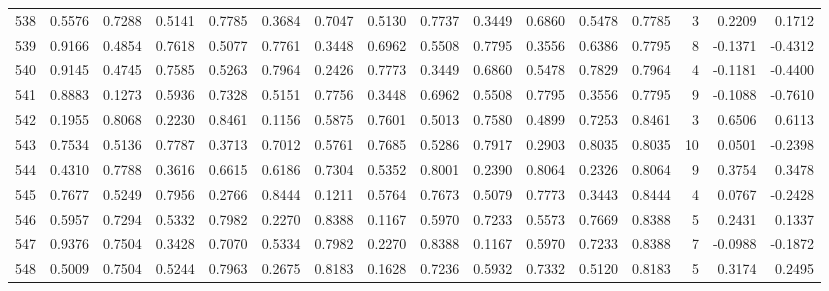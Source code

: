 \begin{tabular}{lrrrrrrrrrrrrrrr}
538 &      0.5576 &  0.7288 &  0.5141 &  0.7785 &  0.3684 &  0.7047 &  0.5130 &  0.7737 &  0.3449 &  0.6860 &   0.5478 &     0.7785 &      3 &                    0.2209 &                     0.1712 \\
539 &      0.9166 &  0.4854 &  0.7618 &  0.5077 &  0.7761 &  0.3448 &  0.6962 &  0.5508 &  0.7795 &  0.3556 &   0.6386 &     0.7795 &      8 &                   -0.1371 &                    -0.4312 \\
540 &      0.9145 &  0.4745 &  0.7585 &  0.5263 &  0.7964 &  0.2426 &  0.7773 &  0.3449 &  0.6860 &  0.5478 &   0.7829 &     0.7964 &      4 &                   -0.1181 &                    -0.4400 \\
541 &      0.8883 &  0.1273 &  0.5936 &  0.7328 &  0.5151 &  0.7756 &  0.3448 &  0.6962 &  0.5508 &  0.7795 &   0.3556 &     0.7795 &      9 &                   -0.1088 &                    -0.7610 \\
542 &      0.1955 &  0.8068 &  0.2230 &  0.8461 &  0.1156 &  0.5875 &  0.7601 &  0.5013 &  0.7580 &  0.4899 &   0.7253 &     0.8461 &      3 &                    0.6506 &                     0.6113 \\
543 &      0.7534 &  0.5136 &  0.7787 &  0.3713 &  0.7012 &  0.5761 &  0.7685 &  0.5286 &  0.7917 &  0.2903 &   0.8035 &     0.8035 &     10 &                    0.0501 &                    -0.2398 \\
544 &      0.4310 &  0.7788 &  0.3616 &  0.6615 &  0.6186 &  0.7304 &  0.5352 &  0.8001 &  0.2390 &  0.8064 &   0.2326 &     0.8064 &      9 &                    0.3754 &                     0.3478 \\
545 &      0.7677 &  0.5249 &  0.7956 &  0.2766 &  0.8444 &  0.1211 &  0.5764 &  0.7673 &  0.5079 &  0.7773 &   0.3443 &     0.8444 &      4 &                    0.0767 &                    -0.2428 \\
546 &      0.5957 &  0.7294 &  0.5332 &  0.7982 &  0.2270 &  0.8388 &  0.1167 &  0.5970 &  0.7233 &  0.5573 &   0.7669 &     0.8388 &      5 &                    0.2431 &                     0.1337 \\
547 &      0.9376 &  0.7504 &  0.3428 &  0.7070 &  0.5334 &  0.7982 &  0.2270 &  0.8388 &  0.1167 &  0.5970 &   0.7233 &     0.8388 &      7 &                   -0.0988 &                    -0.1872 \\
548 &      0.5009 &  0.7504 &  0.5244 &  0.7963 &  0.2675 &  0.8183 &  0.1628 &  0.7236 &  0.5932 &  0.7332 &   0.5120 &     0.8183 &      5 &                    0.3174 &                     0.2495 \\

\end{tabular}
